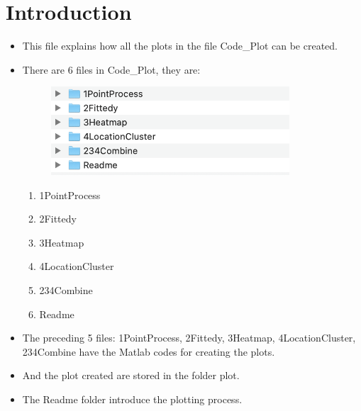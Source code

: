 \documentclass{article}
\begin{document}
%
\setcounter{section}{-1}
\section{Introduction}
\begin{itemize}
	\item This file explains how all the plots in the file Code\_Plot can be created.
	\item There are 6 files in  Code\_Plot, they are:
	 \begin{figure}[h!]
\begin{center}
			\includegraphics[width=3.5in]{name.png}
\end{center}
	\end{figure}
	\begin{enumerate}
		\item 1PointProcess
		\item 2Fittedy
		\item 3Heatmap
		\item 4LocationCluster
		\item 234Combine
		\item Readme
	\end{enumerate}
\item The preceding 5 files: 1PointProcess, 2Fittedy, 3Heatmap, 4LocationCluster, 234Combine have  the Matlab codes for creating the plots.
\item And the plot created are stored in the folder plot.
\item The Readme folder introduce the plotting process.

\end{itemize}
		\pagebreak
\end{document}
